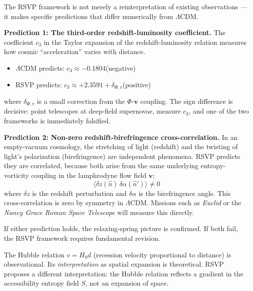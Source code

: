 \begin{tcolorbox}[enhanced, breakable,
  colback=RSVPwarm, colframe=RSVPaccent, arc=4pt, boxrule=0.8pt,
  title={\bfseries\sffamily Worked Example: Two Falsifiable Predictions of RSVP Cosmology},
  coltitle=white, attach boxed title to top left={yshift=-2mm,xshift=6mm},
  boxed title style={colback=RSVPaccent,sharp corners},
  top=4mm,left=4mm,right=4mm,bottom=4mm]

The RSVP framework is not merely a reinterpretation of existing observations —
it makes specific predictions that differ numerically from $\Lambda$CDM.

\textbf{Prediction 1: The third-order redshift-luminosity coefficient.}
The coefficient $c_3$ in the Taylor expansion of the redshift-luminosity
relation measures how cosmic ``acceleration'' varies with distance.
\begin{itemize}
  \item $\Lambda$CDM predicts: $c_3 \approx -0.1804$\quad (negative)
  \item RSVP predicts: $c_3 \approx +2.3591 + \delta_{\Phi,v}$\quad (positive)
\end{itemize}
where $\delta_{\Phi,v}$ is a small correction from the $\Phi$-$\mathbf{v}$ coupling.
The sign difference is decisive: point telescopes at deep-field supernovae,
measure $c_3$, and one of the two frameworks is immediately falsified.

\textbf{Prediction 2: Non-zero redshift-birefringence cross-correlation.}
In an empty-vacuum cosmology, the stretching of light (redshift) and the
twisting of light's polarization (birefringence) are independent phenomena.
RSVP predicts they are correlated, because both arise from the same
underlying entropy-vorticity coupling in the lamphrodyne flow field $\mathbf{v}$:
\[
  \langle \delta z(\hat{n})\,\delta\alpha(\hat{n}')\rangle \neq 0
\]
where $\delta z$ is the redshift perturbation and $\delta\alpha$ is the
birefringence angle. This cross-correlation is zero by symmetry in $\Lambda$CDM.
Missions such as \textit{Euclid} or the \textit{Nancy Grace Roman Space Telescope}
will measure this directly.

If either prediction holds, the relaxing-spring picture is confirmed.
If both fail, the RSVP framework requires fundamental revision.
\end{tcolorbox}


The Hubble relation $v = H_0 d$ (recession velocity proportional to
distance) is observational. Its \emph{interpretation} as spatial expansion
is theoretical. RSVP proposes a different interpretation: the Hubble
relation reflects a gradient in the accessibility entropy field $S$,
not an expansion of space.

